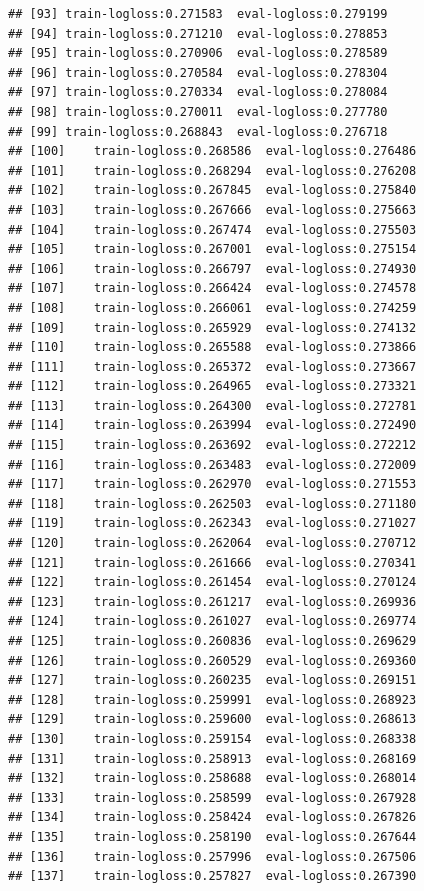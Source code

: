 \documentclass[
]{article}
\begin{document}
\begin{verbatim}
## [93] train-logloss:0.271583  eval-logloss:0.279199 
## [94] train-logloss:0.271210  eval-logloss:0.278853 
## [95] train-logloss:0.270906  eval-logloss:0.278589 
## [96] train-logloss:0.270584  eval-logloss:0.278304 
## [97] train-logloss:0.270334  eval-logloss:0.278084 
## [98] train-logloss:0.270011  eval-logloss:0.277780 
## [99] train-logloss:0.268843  eval-logloss:0.276718 
## [100]    train-logloss:0.268586  eval-logloss:0.276486 
## [101]    train-logloss:0.268294  eval-logloss:0.276208 
## [102]    train-logloss:0.267845  eval-logloss:0.275840 
## [103]    train-logloss:0.267666  eval-logloss:0.275663 
## [104]    train-logloss:0.267474  eval-logloss:0.275503 
## [105]    train-logloss:0.267001  eval-logloss:0.275154 
## [106]    train-logloss:0.266797  eval-logloss:0.274930 
## [107]    train-logloss:0.266424  eval-logloss:0.274578 
## [108]    train-logloss:0.266061  eval-logloss:0.274259 
## [109]    train-logloss:0.265929  eval-logloss:0.274132 
## [110]    train-logloss:0.265588  eval-logloss:0.273866 
## [111]    train-logloss:0.265372  eval-logloss:0.273667 
## [112]    train-logloss:0.264965  eval-logloss:0.273321 
## [113]    train-logloss:0.264300  eval-logloss:0.272781 
## [114]    train-logloss:0.263994  eval-logloss:0.272490 
## [115]    train-logloss:0.263692  eval-logloss:0.272212 
## [116]    train-logloss:0.263483  eval-logloss:0.272009 
## [117]    train-logloss:0.262970  eval-logloss:0.271553 
## [118]    train-logloss:0.262503  eval-logloss:0.271180 
## [119]    train-logloss:0.262343  eval-logloss:0.271027 
## [120]    train-logloss:0.262064  eval-logloss:0.270712 
## [121]    train-logloss:0.261666  eval-logloss:0.270341 
## [122]    train-logloss:0.261454  eval-logloss:0.270124 
## [123]    train-logloss:0.261217  eval-logloss:0.269936 
## [124]    train-logloss:0.261027  eval-logloss:0.269774 
## [125]    train-logloss:0.260836  eval-logloss:0.269629 
## [126]    train-logloss:0.260529  eval-logloss:0.269360 
## [127]    train-logloss:0.260235  eval-logloss:0.269151 
## [128]    train-logloss:0.259991  eval-logloss:0.268923 
## [129]    train-logloss:0.259600  eval-logloss:0.268613 
## [130]    train-logloss:0.259154  eval-logloss:0.268338 
## [131]    train-logloss:0.258913  eval-logloss:0.268169 
## [132]    train-logloss:0.258688  eval-logloss:0.268014 
## [133]    train-logloss:0.258599  eval-logloss:0.267928 
## [134]    train-logloss:0.258424  eval-logloss:0.267826 
## [135]    train-logloss:0.258190  eval-logloss:0.267644 
## [136]    train-logloss:0.257996  eval-logloss:0.267506 
## [137]    train-logloss:0.257827  eval-logloss:0.267390 

\end{verbatim}
\end{document}
